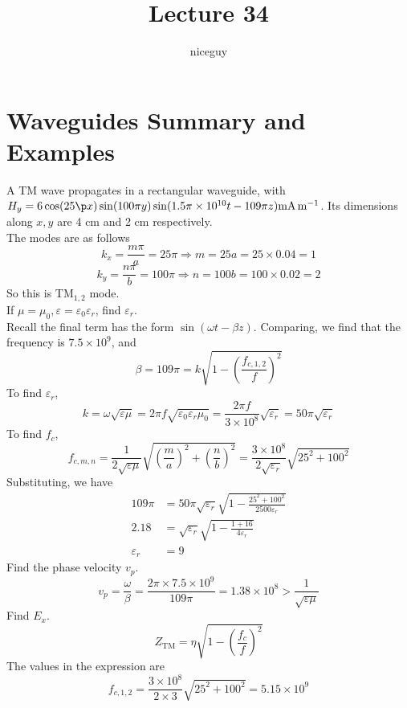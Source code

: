\documentclass[12pt]{article}
\title{Lecture 34}
\author{niceguy}
\begin{document}
\maketitle

\section{Waveguides Summary and Examples}

\begin{ex}
    A TM wave propagates in a rectangular waveguide, with $H_y = 6\cos(25\p x)\sin(100\pi y)\sin(1.5\pi \times 10^{10}t - 109\pi z)\unit{mA.m^{-1}}$. Its dimensions along $x, y$ are 4 cm and 2 cm respectively. \\
    The modes are as follows
    $$k_x = \frac{m\pi}{a} = 25\pi \Rightarrow m = 25a = 25 \times 0.04 = 1$$
    $$k_y = \frac{n\pi}{b} = 100\pi \Rightarrow n = 100b = 100 \times 0.02 = 2$$
    So this is TM$_{1,2}$ mode. \\
    If $\mu = \mu_0, \varepsilon = \varepsilon_0\varepsilon_r$, find $\varepsilon_r$. \\
    Recall the final term has the form $\sin(\omega t - \beta z)$. Comparing, we find that the frequency is $7.5 \times 10^9$, and
    $$\beta = 109\pi = k\sqrt{1 - \left(\frac{f_{c,1,2}}{f}\right)^2}$$
    To find $\varepsilon_r$,
    $$k = \omega\sqrt{\varepsilon\mu} = 2\pi f\sqrt{\varepsilon_0\varepsilon_r\mu_0} = \frac{2\pi f}{3 \times 10^8}\sqrt{\varepsilon_r} = 50\pi\sqrt{\varepsilon_r}$$
    To find $f_c$,
    $$f_{c,m,n} = \frac{1}{2\sqrt{\varepsilon\mu}} \sqrt{\left(\frac{m}{a}\right)^2 + \left(\frac{n}{b}\right)^2} = \frac{3\times10^8}{2\sqrt{\varepsilon_r}} \sqrt{25^2 + 100^2}$$
    Substituting, we have
    \begin{align*}
        109\pi &= 50\pi\sqrt{\varepsilon_r}\sqrt{1 - \frac{25^2+100^2}{2500\varepsilon_r}} \\
        2.18 &= \sqrt{\varepsilon_r}\sqrt{1 - \frac{1 + 16}{4\varepsilon_r}} \\
        \varepsilon_r &= 9
    \end{align*}
    Find the phase velocity $v_p$. \\
    $$v_p = \frac{\omega}{\beta} = \frac{2\pi \times 7.5 \times 10^9}{109\pi} = 1.38 \times 10^8 > \frac{1}{\sqrt{\varepsilon\mu}}$$
    Find $E_x$. \\
    $$Z_{\text{TM}} = \eta\sqrt{1 - \left(\frac{f_c}{f}\right)^2}$$
    The values in the expression are
    $$f_{c,1,2} = \frac{3\times10^8}{2\times3}\sqrt{25^2 + 100^2} = 5.15 \times 10^9$$

\end{ex}
\end{document}
